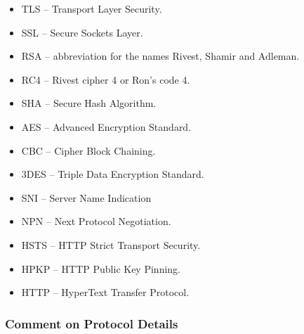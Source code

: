 \documentclass[14pt,a4paper,report]{report}
\begin{document}
\begin{itemize}
	\item TLS -- Transport Layer Security.
	\item SSL -- Secure Sockets Layer.
	\item RSA -- abbreviation for the names Rivest, Shamir and Adleman.
	\item RC4 -- Rivest cipher 4 or Ron’s code 4.
	\item SHA -- Secure Hash Algorithm.
	\item AES -- Advanced Encryption Standard.
	\item CBC -- Cipher Block Chaining.
	\item 3DES -- Triple Data Encryption Standard.
	\item SNI -- Server Name Indication
	\item NPN -- Next Protocol Negotiation.
	\item HSTS -- HTTP Strict Transport Security.
	\item HPKP -- HTTP Public Key Pinning.
	\item HTTP -- HyperText Transfer Protocol.
\end{itemize}

\subsubsection{Comment on Protocol Details}
\end{document}
